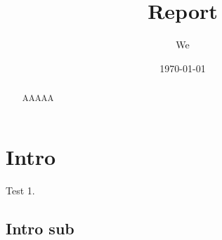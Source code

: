 \documentclass[10pt]{article}
\title{Report}
\date{\today}
\author{We}
\begin{document}
	\maketitle

	\begin{abstract}

		AAAAA
		
	\end{abstract}

	\section{Intro}

	Test 1.

	\subsection{Intro sub}
\end{document}
